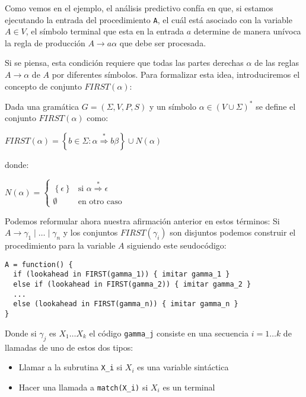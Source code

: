 Como vemos en el ejemplo, el análisis predictivo confía en que, si estamos
ejecutando la entrada del procedimiento \verb|A|,
el cuál está asociado con la variable $A \in V$, el símbolo terminal
que esta en la entrada $a$  determine de manera unívoca la regla
de producción $A \rightarrow a \alpha$ que debe ser procesada.

Si se piensa, esta condición requiere que todas las partes derechas $\alpha$ de
las reglas $A \rightarrow \alpha$ de $A$  por diferentes símbolos.
Para formalizar esta idea, introduciremos el concepto de
conjunto $FIRST(\alpha)$:

\begin{definition}
Dada una gramática 
$G=(\Sigma,V,P,S)$ y un símbolo $\alpha \in (V \cup \Sigma)^*$ se define el conjunto 
$FIRST(\alpha)$ como:

$FIRST(\alpha) = \left \{ b \in \Sigma :  \alpha  \stackrel{*}{\Longrightarrow}  b \beta \right \}
\cup N(\alpha)$ 

\noindent donde:

$N(\alpha) = \left \{ \begin{array}{ll}
                         \left \{ \epsilon \right \}& \mbox{si $\alpha \stackrel{*}{\Longrightarrow} \epsilon$} \\
                         \emptyset & \mbox{en otro caso} 
                      \end{array}
             \right. $ 

\end{definition}


Podemos reformular ahora nuestra afirmación anterior en estos términos:
Si $A \rightarrow \gamma_1 \mid \ldots \mid \gamma_n$ y los conjuntos $FIRST(\gamma_i)$ son 
disjuntos podemos construir el procedimiento para la variable $A$ siguiendo
este seudocódigo:

\begin{verbatim}
A = function() {
  if (lookahead in FIRST(gamma_1)) { imitar gamma_1 }
  else if (lookahead in FIRST(gamma_2)) { imitar gamma_2 }
  ...
  else (lookahead in FIRST(gamma_n)) { imitar gamma_n }
}
\end{verbatim}

Donde si $\gamma_j$ es $X_1 \ldots X_k$ el código \verb|gamma_j| consiste
en una secuencia $i = 1 \ldots k$ de llamadas de uno de estos dos tipos:
\begin{itemize}
\item
Llamar a la subrutina \verb|X_i| si $X_i$ es una variable sintáctica
\item
Hacer una llamada a \verb|match(X_i)| si $X_i$ es un terminal
\end{itemize}

